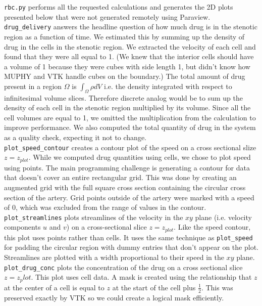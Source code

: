 \documentclass[11pt]{article} %
\newcommand{\tty}[1]{\texttt{#1}}
\begin{document}
\tty{rbc.py} performs all the requested calculations and generates the 2D plots presented 
below that were not generated remotely using Paraview. \\
\tty{drug\_delivery} answers the headline question of how much drug is in the stenotic
region as a function of time.  
We estimated this by summing up the density of drug in the cells in the stenotic region.
We extracted the velocity of each cell and found that they were all equal to 1.
(We knew that the interior cells should have a volume of 1 because they were cubes
with side length 1, but didn't know how MUPHY and VTK handle cubes on the boundary.)
The total amount of drug present in a region $\Omega$ is $\int_{\Omega} \rho dV$
i.e. the density integrated with respect to infinitesimal volume slices.
Therefore discrete analog would be to sum up the density of each cell in the stenotic region multiplied by its volume.  
Since all the cell volumes are equal to 1, we omitted the multiplication from the calculation to improve performance.
We also computed the total quantity of drug in the system as a quality check, expecting it not to change.\\
\tty{plot\_speed\_contour} creates a contour plot of the speed on a cross sectional slize $z=z_{plot}$.
While we computed drug quantities using cells, we chose to plot speed using points.
The main programming challenge is generating a contour for data that doesn't cover an entire rectangular grid.
This was done by creating an augmented grid with the full square cross section containing
the circular cross section of the artery.
Grid points outside of the artery were marked with a speed of 0, which was excluded from the
range of values in the contour.\\
\tty{plot\_streamlines} plots streamlines of the velocity in the $xy$ plane
(i.e. velocity components $u$ and $v$) on a cross-sectional slice $z=z_{plot}$.
Like the speed contour, this plot uses points rather than cells.
It uses the same technique as \tty{plot\_speed} for padding the circular region
with dummy entries that don't appear on the plot.
Streamlines are plotted with a width proportional to their speed in the $xy$ plane.\\
\tty{plot\_drug\_conc} plots the concentration of the drug on a cross sectional slice $z=z_plot$.
This plot uses cell data.  
A mask is created using the relationship that $z$ at the center of a cell is equal to 
$z$ at the start of the cell plus $\frac{1}{2}$.  
This was preserved exactly by VTK so we could create a logical mask efficiently.
\end{document}
